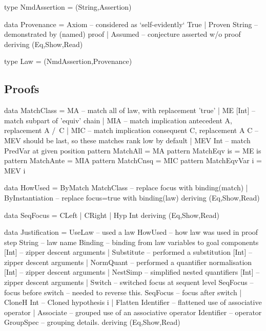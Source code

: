 \begin{code}
type NmdAssertion = (String,Assertion)
\end{code}

\begin{code}
data Provenance
  = Axiom          --  considered as `self-evidently` True
  | Proven String  --  demonstrated by (named) proof
  | Assumed        --  conjecture asserted w/o proof
  deriving (Eq,Show,Read)
\end{code}

\begin{code}
type Law = (NmdAssertion,Provenance)
\end{code}

\newpage
\subsection{Proofs}

\begin{code}
data MatchClass
  = MA       -- match all of law, with replacement 'true'
  | ME [Int] -- match subpart of 'equiv' chain
  | MIA      -- match implication antecedent A, replacement A /\ C
  | MIC      -- match implication consequent C, replacement A \/ C
  -- MEV should be last, so these matches rank low by default
  | MEV Int  -- match PredVar at given position
pattern MatchAll       = MA
pattern MatchEqv is    = ME is
pattern MatchAnte      = MIA
pattern MatchCnsq      = MIC
pattern MatchEqvVar i  = MEV i
\end{code}

\begin{code}
data HowUsed
  = ByMatch MatchClass  -- replace focus with binding(match)
  | ByInstantiation     -- replace focus=true with binding(law)
  deriving (Eq,Show,Read)
\end{code}

\begin{code}
data SeqFocus = CLeft | CRight | Hyp Int deriving (Eq,Show,Read)
\end{code}

\begin{code}
data Justification
  = UseLaw             -- used a law
      HowUsed              -- how law was used in proof step
      String               -- law name
      Binding              -- binding from law variables to goal components
      [Int]                -- zipper descent arguments
  | Substitute         -- performed a substitution
      [Int]                -- zipper descent arguments
  | NormQuant          -- performed a quantifier normalisation
      [Int]                -- zipper descent arguments
  | NestSimp           -- simplified nested quantifiers
      [Int]                -- zipper descent arguments
  | Switch             -- switched focus at sequent level
      SeqFocus             -- focus before switch -- needed to reverse this.
      SeqFocus             -- focus after switch
  | CloneH Int         --  Cloned hypothesis i
  | Flatten Identifier -- flattened use of associative operator
  | Associate          -- grouped use of an associative operator
      Identifier           -- operator
      GroupSpec            -- grouping details.
  deriving (Eq,Show,Read)
\end{code}

